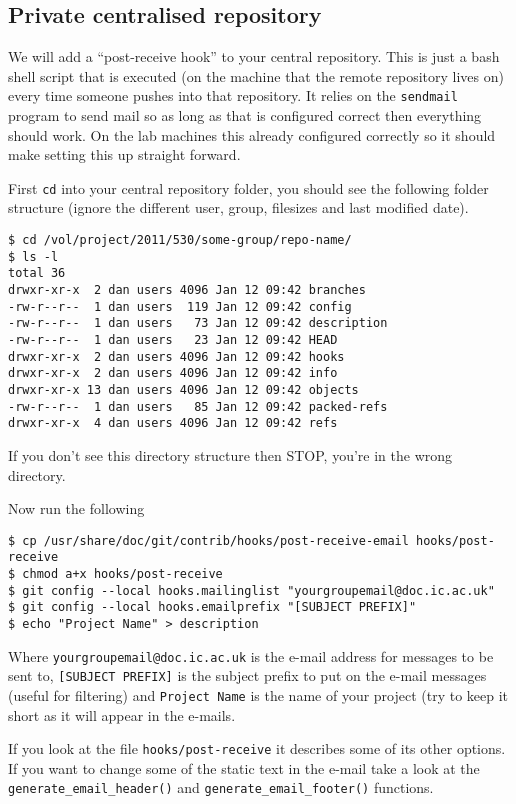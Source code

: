 \documentclass[a4paper,10pt,fleqn]{article}
\begin{document}
\subsection{Private centralised repository}
We will add a ``post-receive hook'' to your central repository. This is just a bash shell script that is executed (on the machine that the remote repository lives on) every time someone pushes into that repository. It relies on the \texttt{sendmail} program to send mail so as long as that is configured correct then everything should work. On the lab machines this already configured correctly so it should make setting this up straight forward.

First \texttt{cd} into your central repository folder, you should see the following folder structure (ignore the different user, group, filesizes and last modified date).
\begin{lstlisting}
$ cd /vol/project/2011/530/some-group/repo-name/
$ ls -l
total 36
drwxr-xr-x  2 dan users 4096 Jan 12 09:42 branches
-rw-r--r--  1 dan users  119 Jan 12 09:42 config
-rw-r--r--  1 dan users   73 Jan 12 09:42 description
-rw-r--r--  1 dan users   23 Jan 12 09:42 HEAD
drwxr-xr-x  2 dan users 4096 Jan 12 09:42 hooks
drwxr-xr-x  2 dan users 4096 Jan 12 09:42 info
drwxr-xr-x 13 dan users 4096 Jan 12 09:42 objects
-rw-r--r--  1 dan users   85 Jan 12 09:42 packed-refs
drwxr-xr-x  4 dan users 4096 Jan 12 09:42 refs
\end{lstlisting}
If you don't see this directory structure then STOP, you're in the wrong directory.

Now run the following
\begin{lstlisting}
$ cp /usr/share/doc/git/contrib/hooks/post-receive-email hooks/post-receive
$ chmod a+x hooks/post-receive
$ git config --local hooks.mailinglist "yourgroupemail@doc.ic.ac.uk"
$ git config --local hooks.emailprefix "[SUBJECT PREFIX]"
$ echo "Project Name" > description
\end{lstlisting}
Where \texttt{yourgroupemail@doc.ic.ac.uk} is the e-mail address for messages to be sent to, \texttt{[SUBJECT PREFIX]} is the subject prefix to put on the e-mail messages (useful for filtering) and \texttt{Project Name} is the name of your project (try to keep it short as it will appear in the e-mails.

If you look at the file \texttt{hooks/post-receive} it describes some of its other options. If you want to change some of the static text in the e-mail take a look at the \texttt{generate\_email\_header()} and \texttt{generate\_email\_footer()} functions.
\end{document}
